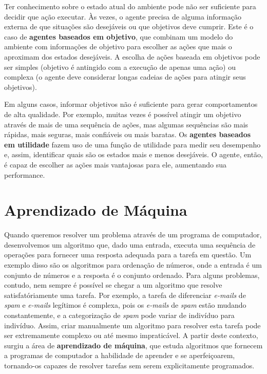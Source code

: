 Ter conhecimento sobre o estado atual do ambiente pode não ser suficiente para
decidir que ação executar. Às vezes, o agente precisa de alguma informação
externa de que situações são desejáveis ou que objetivos deve cumprir. Este é o
caso de \textbf{agentes baseados em objetivo}, que combinam um modelo do
ambiente com informações de objetivo para escolher as ações que mais o aproximam
dos estados desejáveis. A escolha de ações baseada em objetivos pode ser simples
(objetivo é antingido com a execução de apenas uma ação) ou complexa (o agente
deve considerar longas cadeias de ações para atingir seus objetivos).

Em alguns casos, informar objetivos não é suficiente para gerar comportamentos
de alta qualidade. Por exemplo, muitas vezes é possível atingir um objetivo
através de mais de uma sequência de ações, mas algumas sequências são mais
rápidas, mais seguras, mais confiáveis ou mais baratas. Os \textbf{agentes
baseados em utilidade} fazem uso de uma função de utilidade para medir seu
desempenho e, assim, identificar quais são os estados mais e menos desejáveis. O
agente, então, é capaz de escolher as ações mais vantajosas para ele, aumentando
sua performance.


\section{\label{section:machine-learning}Aprendizado de Máquina}
Quando queremos resolver um problema através de um programa de computador,
desenvolvemos um algoritmo que, dado uma entrada, executa uma sequência de
operações para fornecer uma resposta adequada para a tarefa em questão. Um
exemplo disso são os algoritmos para ordenação de números, onde a entrada é
um conjunto de números e a resposta é o conjunto ordenado. Para alguns
problemas, contudo, nem sempre é possível se chegar a um algoritmo que resolve
satisfatóriamente uma tarefa. Por exemplo, a tarefa de diferenciar
\textit{e-mails} de \textit{spam} e \textit{e-mails} legítimos é complexa, pois
os \textit{e-mails} de \textit{spam} estão mudando constantemente, e a
categorização de \textit{spam} pode variar de indivíduo para indivíduo. Assim,
criar manualmente um algoritmo para resolver esta tarefa pode ser extremamente
complexo ou até mesmo impraticável. A partir deste contexto, surgiu a área de
\textbf{aprendizado de máquina}, que estuda algoritmos que fornecem a programas
de computador a habilidade de aprender e se aperfeiçoarem, tornando-os capazes
de resolver tarefas sem serem explicitamente programados.

